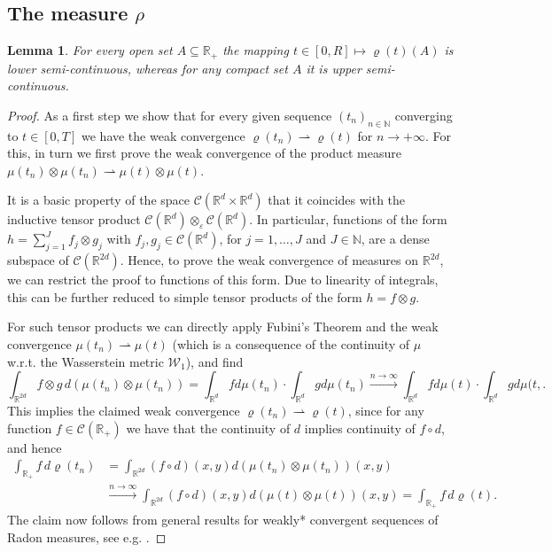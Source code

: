 \documentclass[A4paper,11pt]{article}
\newtheorem{lemma}[theorem]{Lemma}
\theoremstyle{definition}
\newcommand{\N}{\mathbb{N}}
\newcommand{\R}{\mathbb{R}}
\newcommand{\W}{\mathcal{W}}
\begin{document}
\subsection{The measure $\rho$}

\begin{lemma}\label{rhosc}
	For every open set $A\subseteq\R_+$ the mapping $t \in [0,R] \mapsto\varrho(t)(A)$ is lower semi-continuous, whereas for
	any compact set $A$ it is upper semi-continuous.
\end{lemma}

\begin{proof}As a first step we show that for every given sequence $(t_n)_{n \in \N}$ converging to $t\in [0,T]$ we have the weak
	convergence $\varrho(t_n)\rightharpoonup\varrho(t)$ for $n \rightarrow +\infty$. For this, in turn we first prove the weak convergence of the product measure
	$\mu(t_n)\otimes\mu(t_n)\rightharpoonup\mu(t)\otimes\mu(t)$.
	
	It is a basic property of the space $\mathcal{C}(\R^d\times\R^d)$ that it coincides with the inductive tensor product
	$\mathcal{C}(\R^d)\otimes_\varepsilon \mathcal{C}(\R^d)$. In particular, functions of the form $h=\sum_{j=1}^J f_j\otimes g_j$ with
	$f_j,g_j\in \mathcal{C}(\R^d)$, for $j=1,\ldots,J$ and $J\in\N$, are a dense subspace of $\mathcal{C}(\R^{2d})$. Hence, to prove the weak
	convergence of measures on $\R^{2d}$, we can restrict the proof to functions of this form. Due to linearity of
	integrals, this can be further reduced to simple tensor products of the form $h=f\otimes g$.
	
	For such tensor products we can directly apply Fubini's Theorem and the weak convergence
	$\mu(t_n)\rightharpoonup\mu(t)$ (which is a consequence of the continuity of $\mu$ w.r.t. the
	Wasserstein metric $\W_1$), and find
	\[
		\int_{\R^{2d}}f\otimes g\, d(\mu(t_n)\otimes\mu(t_n))
			=\int_{\R^d}f d\mu(t_n)\cdot\int_{\R^d}g d\mu(t_n)
			\stackrel{n\rightarrow\infty}{\longrightarrow}\int_{\R^d}f d\mu(t)\cdot\int_{\R^d}g d\mu(t,.
	\]
	This implies the claimed weak convergence $\varrho(t_n)\rightharpoonup\varrho(t)$, since for any
	function $f\in \mathcal{C}(\R_+)$ we have that the continuity of $d$ implies continuity of $f\circ d$, and hence
	\begin{align*}
		\int_{\R_+}f\,d\varrho(t_n)
			&=\int_{\R^{2d}}(f\circ d)(x,y)d(\mu(t_n)\otimes\mu(t_n))(x,y)\\
			&\stackrel{n\rightarrow\infty}{\longrightarrow}
				\int_{\R^{2d}}(f\circ d)(x,y)d(\mu(t)\otimes\mu(t))(x,y)
			=\int_{\R_+}f\,d\varrho(t).
	\end{align*}
	The claim now follows from general results for weakly* convergent sequences of Radon measures, see e.g. \cite[Proposition 1.62]{AFP00}.
\end{proof}
\end{document}
